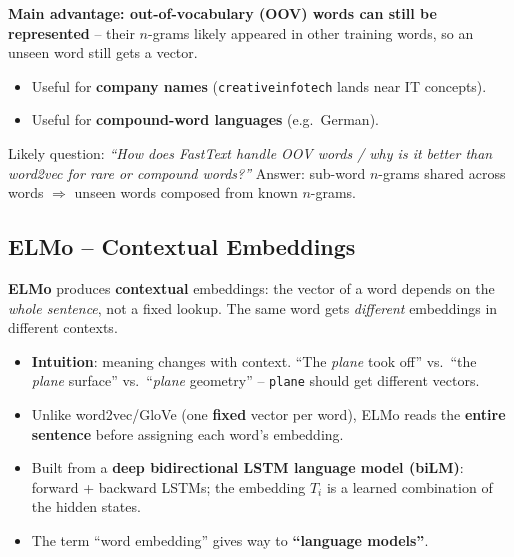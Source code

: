 \documentclass[10pt,a4paper]{article}
\begin{document}
	\begin{importantbox}
		\textbf{Main advantage: out-of-vocabulary (OOV) words can still be represented} -- their $n$-grams likely appeared in other training words, so an unseen word still gets a vector.
		\begin{itemize}[leftmargin=1.2em, nosep]
			\item Useful for \textbf{company names} (\texttt{creativeinfotech} lands near IT concepts).
			\item Useful for \textbf{compound-word languages} (e.g.\ German).
		\end{itemize}
	\end{importantbox}

	\begin{examtipbox}
		Likely question: \emph{``How does FastText handle OOV words / why is it better than word2vec for rare or compound words?''} Answer: sub-word $n$-grams shared across words $\Rightarrow$ unseen words composed from known $n$-grams.
	\end{examtipbox}

	\subsection{ELMo -- Contextual Embeddings}

	\begin{definitionbox}
		\textbf{ELMo} produces \textbf{contextual} embeddings: the vector of a word depends on the \emph{whole sentence}, not a fixed lookup. The same word gets \emph{different} embeddings in different contexts.
	\end{definitionbox}

	\begin{itemize}[leftmargin=*]
		\item \textbf{Intuition}: meaning changes with context. ``The \textit{plane} took off'' vs.\ ``the \textit{plane} surface'' vs.\ ``\textit{plane} geometry'' -- \texttt{plane} should get different vectors.
		\item Unlike word2vec/GloVe (one \textbf{fixed} vector per word), ELMo reads the \textbf{entire sentence} before assigning each word's embedding.
		\item Built from a \textbf{deep bidirectional LSTM language model (biLM)}: forward + backward LSTMs; the embedding $T_i$ is a learned combination of the hidden states.
		\item The term ``word embedding'' gives way to \textbf{``language models''}.
	\end{itemize}
\end{document}
